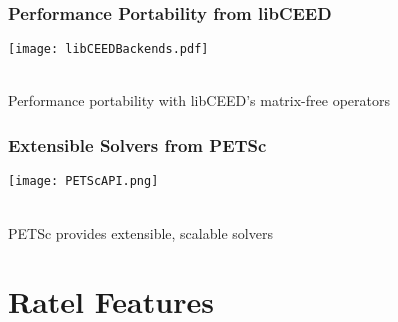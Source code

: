 \documentclass{beamer}
\begin{document}

\begin{frame}
\begin{center}
\frametitle{Performance Portability from libCEED}

\texttt{[image: libCEEDBackends.pdf]}

~\\

Performance portability with libCEED's matrix-free operators\\

\end{center}
\end{frame}


\begin{frame}
\begin{center}
\frametitle{Extensible Solvers from PETSc}

\texttt{[image: PETScAPI.png]}

~\\

PETSc provides extensible, scalable solvers\\

\end{center}
\end{frame}

\section{Ratel Features}
\end{document}
